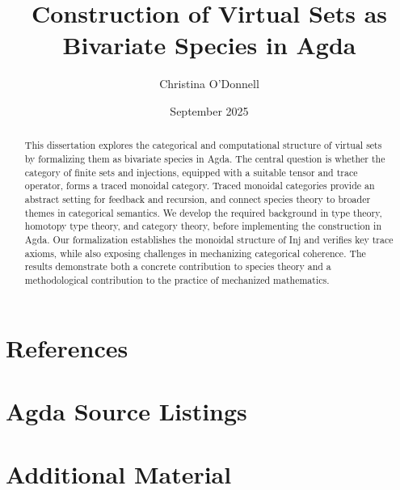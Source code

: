 \documentclass[12pt,a4paper]{report}
\title{Construction of Virtual Sets as Bivariate Species in Agda}
\author{Christina O'Donnell}
\date{September 2025}
\begin{document}
\maketitle
\begin{abstract}
	This dissertation explores the categorical and computational structure of
	virtual sets by formalizing them as bivariate species in Agda. The central
	question is whether the category of finite sets and injections, equipped
	with a suitable tensor and trace operator, forms a traced monoidal category.
	Traced monoidal categories provide an abstract setting for feedback and
	recursion, and connect species theory to broader themes in categorical
	semantics. We develop the required background in type theory, homotopy type
	theory, and category theory, before implementing the construction in Agda.
	Our formalization establishes the monoidal structure of Inj and verifies key
	trace axioms, while also exposing challenges in mechanizing categorical
	coherence. The results demonstrate both a concrete contribution to species
	theory and a methodological contribution to the practice of mechanized
	mathematics.
\end{abstract}
\tableofcontents
\listoffigures
\listoftables



\appendix
\chapter{References}


\chapter{Agda Source Listings}
\chapter{Additional Material}
\end{document}
